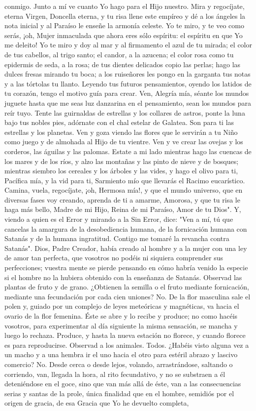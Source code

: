 \documentclass[12pt]{book} %
\begin{document}
conmigo. Junto a mí ve cuanto Yo hago para el Hijo nuestro. Mira y regocíjate, eterna Virgen, Doncella eterna, y tu risa llene este empíreo y dé a los ángeles la nota inicial y al Paraíso le enseñe la armonía celeste. Yo te miro, y te veo como serás, ¡oh, Mujer inmaculada que ahora eres sólo espíritu: el espíritu en que Yo me deleito! Yo te miro y doy al mar y al firmamento el azul de tu mirada; el color de tus cabellos, al trigo santo; el candor, a la azucena; el color rosa como tu epidermis de seda, a la rosa; de tus dientes delicados copio las perlas; hago las dulces fresas mirando tu boca; a los ruiseñores les pongo en la garganta tus notas y a las tórtolas tu llanto. Leyendo tus futuros pensamientos, oyendo los latidos de tu corazón, tengo el motivo guía para crear. Ven, Alegría mía, séante los mundos juguete hasta que me seas luz danzarina en el pensamiento, sean los mundos para reír tuyo. Tente las guirnaldas de estrellas y los collares de astros, ponte la luna bajo tus nobles pies, adórnate con el chal estelar de Galatea. Son para ti las estrellas y los planetas. Ven y goza viendo las flores que le servirán a tu Niño como juego y de almohada al Hijo de tu vientre. Ven y ve crear las ovejas y los corderos, las águilas y las palomas. Estate a mi lado mientras hago las cuencas de los mares y de los ríos, y alzo las montañas y las pinto de nieve y de bosques; mientras siembro los cereales y los árboles y las vides, y hago el olivo para ti, Pacífica mía, y la vid para ti, Sarmiento mío que llevarás el Racimo eucarístico. Camina, vuela, regocíjate, ¡oh, Hermosa mía!, y que el mundo universo, que en diversas fases voy creando, aprenda de ti a amarme, Amorosa, y que tu risa le haga más bello, Madre de mi Hijo, Reina de mi Paraíso, Amor de tu Dios". Y, viendo a quien es el Error y mirando a la Sin Error, dice: "Ven a mí, tú que cancelas la amargura de la desobediencia humana, de la fornicación humana con Satanás y de la humana ingratitud. Contigo me tomaré la revancha contra Satanás". Dios, Padre Creador, había creado al hombre y a la mujer con una ley de amor tan perfecta, que vosotros no podéis ni siquiera comprender sus perfecciones; vuestra mente se pierde pensando en cómo habría venido la especie si el hombre no la hubiera obtenido con la enseñanza de Satanás. Observad las plantas de fruto y de grano. ¿Obtienen la semilla o el fruto mediante fornicación, mediante una fecundación por cada cien uniones? No. De la flor masculina sale el polen y, guiado por un complejo de leyes meteóricas y magnéticas, va hacia el ovario de la flor femenina. Éste se abre y lo recibe y produce; no como hacéis vosotros, para experimentar al día siguiente la misma sensación, se mancha y luego lo rechaza. Produce, y hasta la nueva estación no florece, y cuando florece es para reproducirse. Observad a los animales. Todos. ¿Habéis visto alguna vez a un macho y a una hembra ir el uno hacia el otro para estéril abrazo y lascivo comercio? No. Desde cerca o desde lejos, volando, arrastrándose, saltando o corriendo, van, llegada la hora, al rito fecundativo, y no se substraen a él deteniéndose en el goce, sino que van más allá de éste, van a las consecuencias serias y santas de la prole, única finalidad que en el hombre, semidiós por el origen de gracia, de esa Gracia que Yo he devuelto completa, 
\end{document}
